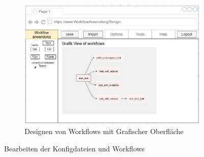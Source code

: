 \begin{figure}[ht]
\begin{subfigure}{.75\textwidth}
        \includegraphics[width = \textwidth]{Grafiken/Gui Mockups/workflowGui-Design.drawio.png}
        \caption{Designen von Workflows mit Grafischer Oberfläche}
        \label{fig:sfigGraficDesign}
   \end{subfigure}
   \caption{Bearbeiten der Konfigdateien und Workflows}
   \label{fig:Abb 4}
\end{figure}
    

